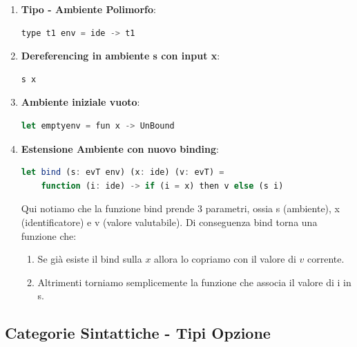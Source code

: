 \documentclass{article}
\begin{document}
\begin{enumerate}

\item \textbf{Tipo - Ambiente Polimorfo}: 
\vspace*{10px}
\begin{lstlisting}[language = JavaScript]
    type t1 env = ide -> t1 
\end{lstlisting}
\vspace*{-20px}

\item \textbf{Dereferencing in ambiente s con input x}: 
\vspace*{10px}
\begin{lstlisting}[language = JavaScript]
    s x
\end{lstlisting}
\vspace*{-20px}

\item \textbf{Ambiente iniziale vuoto}: 
\vspace*{10px}
\begin{lstlisting}[language = JavaScript]
    let emptyenv = fun x -> UnBound
\end{lstlisting}
\vspace*{-20px}

\item \textbf{Estensione Ambiente con nuovo binding}: 
\vspace*{10px}
\begin{lstlisting}[language = JavaScript]
    let bind (s: evT env) (x: ide) (v: evT) = 
    function (i: ide) -> if (i = x) then v else (s i)
\end{lstlisting}
\vspace*{-20px}

Qui notiamo che la funzione bind prende $3$ parametri, ossia s (ambiente), x (identificatore) e v (valore valutabile). Di conseguenza bind torna una funzione che:
\begin{enumerate}
    \item Se già esiste il bind sulla $x$ allora lo copriamo con il valore di $v$ corrente.
    \item Altrimenti torniamo semplicemente la funzione che associa il valore di i in s.
\end{enumerate}
\end{enumerate}

\subsection{Categorie Sintattiche - Tipi Opzione}
\end{document}

